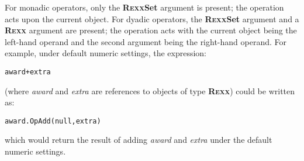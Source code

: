 For monadic operators, only the \textbf{R\textsc{exx}Set} argument is present;
the operation acts upon the current object.
For dyadic operators, the \textbf{R\textsc{exx}Set} argument and
a \textbf{R\textsc{exx}} argument are present; the operation acts with the
current object being the left-hand operand and the second argument being
the right-hand operand.  For example, under default numeric settings,
the expression:
\begin{alltt}
award+extra
\end{alltt}
(where \emph{award} and \emph{extra} are references to objects
of type \textbf{R\textsc{exx}}) could be written as:
\begin{alltt}
award.OpAdd(null, extra)
\end{alltt}
which would return the result of adding \emph{award} and
\emph{extra} under the default numeric settings.
